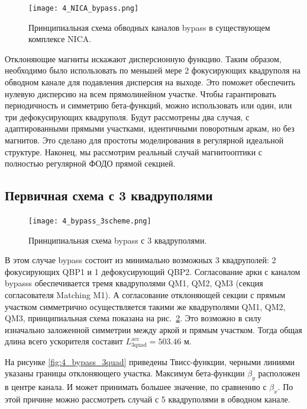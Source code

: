 \begin{figure}[!h]
  \centering
   \texttt{[image: 4\_NICA\_bypass.png]}
   \caption{Принципиальная схема обводных каналов bypass в существующем комплексе NICA.}
   \label{fig:4_NICA_bypass}
\end{figure}

\par Отклоняющие магниты искажают дисперсионную функцию. Таким образом, необходимо было использовать по меньшей мере 2 фокусирующих квадруполя на обводном канале для подавления дисперсия на выходе. Это поможет обеспечить нулевую дисперсию на всем прямолинейном участке. Чтобы гарантировать периодичность и симметрию бета-функций, можно использовать или один, или три дефокусирующих квадруполя. Будут рассмотрены два случая, с адаптированными прямыми участками, идентичными поворотным аркам, но без магнитов. Это сделано для простоты моделирования в регулярной идеальной структуре. Наконец, мы рассмотрим реальный случай магнитооптики с полностью регулярной ФОДО прямой секцией.

	\subsection{Первичная схема с 3 квадруполями}\label{sec:EDM/Wien_filter/ByPass/3quad}

\begin{figure}[!h]
	\centering
	\texttt{[image: 4\_bypass\_3scheme.png]}
	\caption{Принципиальная схема bypass с 3 квадруполями.}
	\label{fig:4_bypass_3scheme}
\end{figure}

\par В этом случае bypass состоит из минимально возможных 3 квадруполей: 2 фокусирующих QBP1 и 1 дефокусирующий QBP2. Согласование арки с каналом bypasss обеспечивается тремя квадруполями QM1, QM2, QM3 (секция согласователя Matching M1). А согласование отклоняющей секции с прямым участком симметрично осуществляется такими же квадруполями QM1, QM2, QM3, принципиальная схема показана на рис.~\ref{fig:4_bypass_3scheme}. Это возможно в силу изначально заложенной симметрии между аркой и прямым участком. Тогда общая длина всего ускорителя составит $L_{\textrm{3quad}}^{\textrm{acc}}=503.46$ м.
\par На рисунке \ref{fig:4_bypass_3quad} приведены Твисс-функции, черными линиями указаны границы отклоняющего участка. Максимум бета-функции $\beta_y$ расположен в центре канала. И может принимать большее значение, по сравнению с $\beta_{x}$. По этой причине можно рассмотреть случай с 5 квадруполями в обводном канале.

